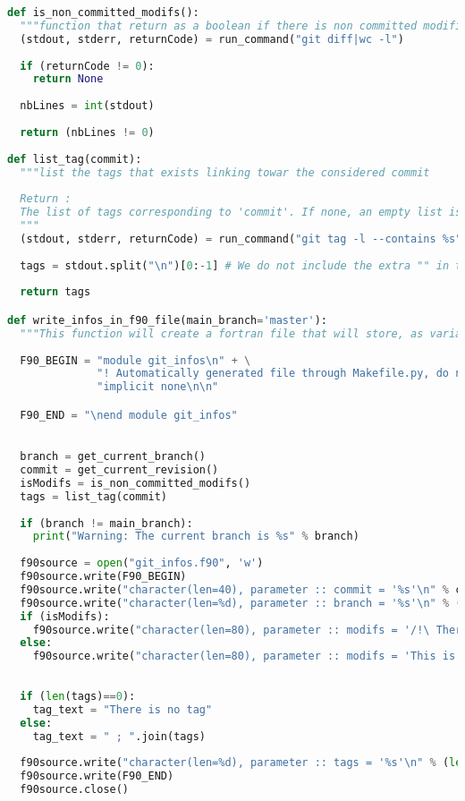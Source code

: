 \begin{lstlisting}[language=python]
def is_non_committed_modifs():
  """function that return as a boolean if there is non committed modifications in the repository"""
  (stdout, stderr, returnCode) = run_command("git diff|wc -l")
  
  if (returnCode != 0):
    return None
  
  nbLines = int(stdout)
  
  return (nbLines != 0)
  
def list_tag(commit):
  """list the tags that exists linking towar the considered commit
  
  Return :
  The list of tags corresponding to 'commit'. If none, an empty list is returned.
  """
  (stdout, stderr, returnCode) = run_command("git tag -l --contains %s" % commit)
  
  tags = stdout.split("\n")[0:-1] # We do not include the extra "" in the end.
  
  return tags 

def write_infos_in_f90_file(main_branch='master'):
  """This function will create a fortran file that will store, as variable, some infos about a git repository"""
  
  F90_BEGIN = "module git_infos\n" + \
              "! Automatically generated file through Makefile.py, do not modify manually !\n" + \
              "implicit none\n\n"

  F90_END = "\nend module git_infos"

  
  branch = get_current_branch()
  commit = get_current_revision()
  isModifs = is_non_committed_modifs()
  tags = list_tag(commit)
  
  if (branch != main_branch):
    print("Warning: The current branch is %s" % branch)
  
  f90source = open("git_infos.f90", 'w')
  f90source.write(F90_BEGIN)
  f90source.write("character(len=40), parameter :: commit = '%s'\n" % commit)
  f90source.write("character(len=%d), parameter :: branch = '%s'\n" % (len(branch), branch))
  if (isModifs):
    f90source.write("character(len=80), parameter :: modifs = '/!\ There is non committed modifications'\n")
  else:
    f90source.write("character(len=80), parameter :: modifs = 'This is a pure version (without any local modifs)'\n")
    
  
  if (len(tags)==0):
    tag_text = "There is no tag"
  else:
    tag_text = " ; ".join(tags)
  
  f90source.write("character(len=%d), parameter :: tags = '%s'\n" % (len(tag_text), tag_text))
  f90source.write(F90_END)
  f90source.close()
\end{lstlisting}

